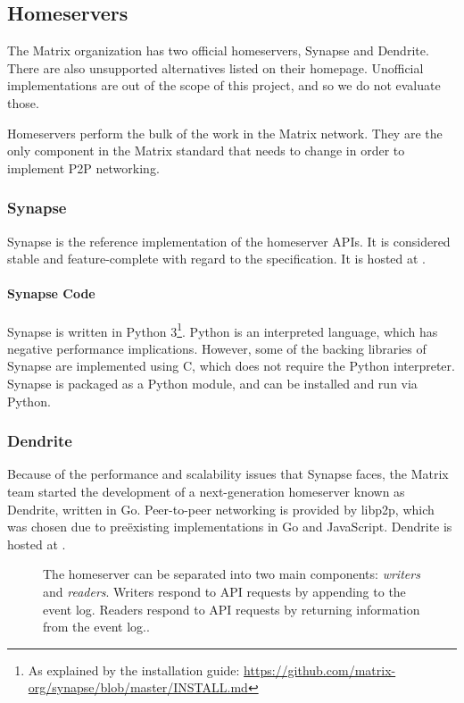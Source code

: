 \subsection{Homeservers}\label{sec:official_homeservers}
The Matrix organization has two official homeservers, Synapse\cite{matrix_org_synapse} and Dendrite\cite{matrix_org_dendrite}.
There are also unsupported alternatives listed on their homepage\cite{try_matrix}.
Unofficial implementations are out of the scope of this project, and so we do not evaluate those.

Homeservers perform the bulk of the work in the Matrix network.
They are the only component in the Matrix standard that needs to change in order to implement \ac{P2P} networking\cite{fosdem_event_p2p_matrix}.

\subsubsection{Synapse}
Synapse is the reference implementation of the homeserver \ac{API}s.
It is considered stable and feature-complete with regard to the specification.
It is hosted at .

\paragraph{Synapse Code}
Synapse is written in Python 3\footnote{As explained by the installation guide: \url{https://github.com/matrix-org/synapse/blob/master/INSTALL.md}}.
Python is an interpreted language, which has negative performance implications.
However, some of the backing libraries of Synapse are implemented using C, which does not require the Python interpreter.
Synapse is packaged as a Python module, and can be installed and run via Python.

\subsubsection{Dendrite}\label{sec:dendrite}
Because of the performance and scalability issues that Synapse faces, the Matrix team started the development of a next-generation homeserver known as Dendrite, written in Go.
Peer-to-peer networking is provided by libp2p, which was chosen due to preëxisting implementations in Go and JavaScript.
Dendrite is hosted at .

\begin{figure}
	\centering
	\resizebox{!}{!}{}
	\caption{
		The homeserver can be separated into two main components: \textit{writers} and \textit{readers}.
		Writers respond to API requests by appending to the event log.
		Readers respond to API requests by returning information from the event log.\cite{dendrite_design_md}.
	}%
	\label{fig:dendrite_design}
\end{figure}

